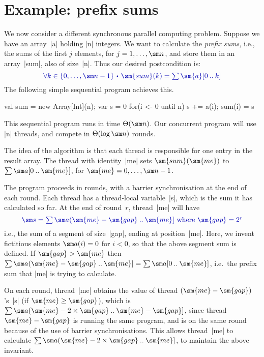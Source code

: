 \section{Example: prefix sums}

\def\revint#1#2{(#1 \upto #2]}

We now consider a different synchronous parallel computing problem.  Suppose
we have an array~|a| holding |n| integers.  We want to calculate the
\emph{prefix sums}, i.e., the sums of the first $j$ elements, for $j = 1,
\ldots, \sm n$, and store them in an array~|sum|, also of size~|n|.  Thus our
desired postcondition is:
\[\mstyle
\forall k \in \set{0, \ldots, \sm n-1} \spot 
  \sm{sum}(k) = \textstyle\sum \sm{a}[0 \upto k] 
\]
The following simple sequential program achieves this.
\begin{scala}
  val sum = new Array[Int](n); var s = 0
  for(i <- 0 until n){ s += a(i); sum(i) = s }
\end{scala}
%
This sequential program runs in time $\Theta(\sm n)$.  Our concurrent program
will use |n| threads, and compete in $\Theta(\log \sm n)$ rounds. 

The idea of the algorithm is that each thread is responsible for one entry in
the result array.  The thread with identity~|me| sets $\sm{sum}(\sm{me})$ to
$\sum \sm a[0 \upto \sm{me}]$, for $\sm{me} = 0,\ldots,\sm n-1$.

The program proceeds in rounds, with a barrier synchronisation at the end of
each round.  Each thread has a thread-local variable~|s|, which is the sum it
has calculated so far.  At the end of round~$r$, thread~|me| will have
\[\mstyle
\sm s = \textstyle\sum \sm a(\sm{me}-\sm{gap} \upto \sm{me}]
   \mbox{ where } \sm{gap} = 2^r
\]
i.e., the sum of a segment of size~|gap|, ending at position~|me|.  Here, we
invent fictitious elements $\sm a(i) = 0$ for $i < 0$, so that the above
segment sum is defined.  If $\sm{gap} > \sm{me}$ then $\sum \sm
a\revint{\sm{me}-\sm{gap}}{\sm{me}} = \sum \sm a[0 \upto \sm{me}]$, i.e.~the
prefix sum that |me| is trying to calculate.

On each round, thread~|me| obtains the value of thread
$(\sm{me}-\sm{gap})$'s~|s| (if $\sm{me} \ge \sm{gap}$), which is $\sum \sm
a\revint{\sm{me}-2 \times \sm{gap}}{\sm{me}-\sm{gap}}$, since thread
$\sm{me}-\sm{gap}$ is running the same program, and is on the same round
because of the use of barrier synchronisations.  This allows thread~|me| to
calculate $\sum \sm a\revint{\sm{me}-2 \times \sm{gap}}{\sm{me}}$, to maintain
the above invariant.

